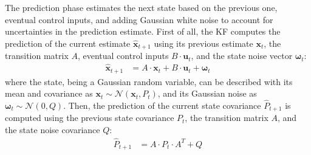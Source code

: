 The prediction phase estimates the next state based on the previous one, eventual control inputs, and adding Gaussian white noise to account for uncertainties in the prediction estimate.
First of all, the \gls{KF} computes the prediction of the current estimate $\hat{\mathbf{x}}_{t+1}$ using its previous estimate $\mathbf{x}_t $, the transition matrix $A$, eventual control inputs $B \cdot \mathbf{u}_t$, and the state noise vector $\boldsymbol \omega_t$:
\begin{align}
\hat{\mathbf{x}}_{t+1} & = A \cdot \mathbf{x}_t + B \cdot \mathbf{u}_t + \boldsymbol \omega_t
  \label{eq:pred-state}
\end{align}
where the state, being a Gaussian random variable, can be described with its mean and covariance as $\mathbf{x}_{t} \sim \mathcal{N}\left(\mathbf{x}_{t},P_{t}\right)$, and its Gaussian noise as $\boldsymbol \omega_t \sim \mathcal{N}\left(0, Q\right)$.
Then, the prediction of the current state covariance $\hat{P}_{t+1}$ is computed using the previous state covariance $P_t$, the transition matrix $A$, and the state noise covariance $Q$:
    \begin{align}
        \hat{P}_{t+1} & = A \cdot P_t \cdot A^T + Q
    \end{align}


